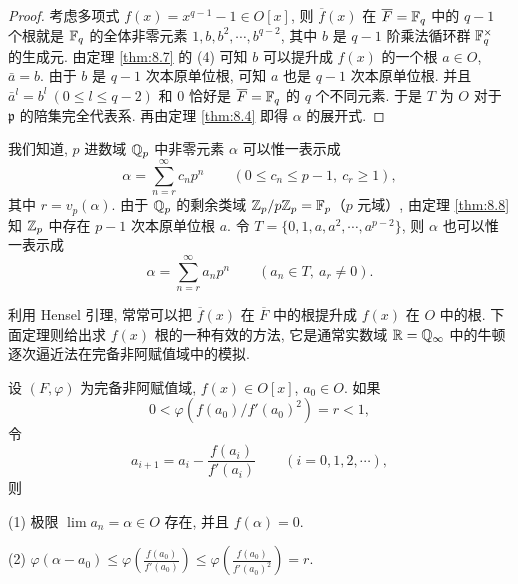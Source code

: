 \begin{proof}
考虑多项式 $f(x)=x^{q-1}-1\in O[x]$, 则 $\overline{f}(x)$ 在 $\overline{F}=\mathbb{F}_q$ 中的 $q-1$ 个根就是 $\mathbb{F}_q$ 的全体非零元素 $1,b,b^2,\cdots,b^{q-2}$, 其中 $b$ 是 $q-1$ 阶乘法循环群 $\mathbb{F}_q^{\times}$ 的生成元. 由定理 \ref{thm:8.7} 的 (4) 可知 $b$ 可以提升成 $f(x)$ 的一个根 $a\in O$, $\bar{a}=b$. 由于 $b$ 是 $q-1$ 次本原单位根, 可知 $a$ 也是 $q-1$ 次本原单位根. 并且 $\bar{a}^l=b^l\ (0\leqslant l\leqslant q-2)$ 和 $0$ 恰好是 $\overline{F}=\mathbb{F}_q$ 的 $q$ 个不同元素. 于是 $T$ 为 $O$ 对于 $\mathfrak{p}$ 的陪集完全代表系. 再由定理 \ref{thm:8.4} 即得 $\alpha$ 的展开式.
\end{proof}

\begin{remark}
我们知道, $p$ 进数域 $\mathbb{Q}_p$ 中非零元素 $\alpha$ 可以惟一表示成
\[
  \alpha=\sum_{n=r}^{\infty}c_np^n\qquad(0\leqslant c_n\leqslant p-1,\ c_r\geqslant 1),
\]
其中 $r=v_p(\alpha)$. 由于 $\mathbb{Q}_p$ 的剩余类域 $\mathbb{Z}_p/p\mathbb{Z}_p=\mathbb{F}_p$（$p$ 元域）, 由定理 \ref{thm:8.8} 知 $\mathbb{Z}_p$ 中存在 $p-1$ 次本原单位根 $a$. 令 $T=\{0,1,a,a^2,\cdots,a^{p-2}\}$, 则 $\alpha$ 也可以惟一表示成
\[
  \alpha=\sum_{n=r}^{\infty}a_np^n\qquad(a_n\in T,\ a_r\neq 0).
\]
\end{remark}

利用 Hensel 引理, 常常可以把 $\overline{f}(x)$ 在 $\overline{F}$ 中的根提升成 $f(x)$ 在 $O$ 中的根. 下面定理则给出求 $f(x)$ 根的一种有效的方法, 它是通常实数域 $\mathbb{R}=\mathbb{Q}_{\infty}$ 中的牛顿逐次逼近法在完备非阿赋值域中的模拟.

\begin{theorem}\label{thm:8.9}
设 $(F,\varphi)$ 为完备非阿赋值域, $f(x)\in O[x]$, $a_0\in O$. 如果
\[
  0<\varphi\left(f(a_0)/f'(a_0)^2\right)=r<1,
\]
令
\begin{equation}\tag{4}
  a_{i+1}=a_i-\frac{f(a_i)}{f'(a_i)}\qquad(i=0,1,2,\cdots),
\end{equation}
则

(1) 极限 $\lim a_n=\alpha\in O$ 存在, 并且 $f(\alpha)=0$.

(2) $\varphi(\alpha-a_0)\leqslant\varphi\left(\frac{f(a_0)}{f'(a_0)}\right)\leqslant\varphi\left(\frac{f(a_0)}{f'(a_0)^2}\right)=r$.
\end{theorem}

